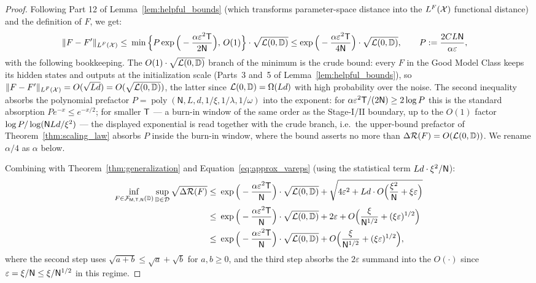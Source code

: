 \documentclass[11pt]{article}
\theoremstyle{plain}
\DeclareMathOperator{\poly}{poly}
\begin{document}
\begin{proof}
    Following Part 12 of Lemma~\ref{lem:helpful_bounds} (which transforms parameter-space distance into the $L^F({\cal X})$ functional distance) and the definition of $F$, we get:
    \begin{align*}
        \| F - F'\|_{L^F({\cal X})} \leq & ~ \min\Big\{ P\exp\Big(-\frac{\alpha \varepsilon^2 \mathsf{T}}{2\mathsf{N}}\Big),\, O(1) \Big\} \cdot \sqrt{{\cal L}(0, \mathbb{D})} \leq \exp\Big(-\frac{\alpha \varepsilon^2 \mathsf{T}}{4\mathsf{N}}\Big) \cdot \sqrt{{\cal L}(0, \mathbb{D})}, \qquad P := \frac{2CL\mathsf{N}}{\alpha\varepsilon},
    \end{align*}
    with the following bookkeeping. The $O(1)\cdot\sqrt{{\cal L}(0,\mathbb{D})}$ branch of the minimum is the crude bound: every $F$ in the Good Model Class keeps its hidden states and outputs at the initialization scale (Parts~3 and~5 of Lemma~\ref{lem:helpful_bounds}), so $\|F-F'\|_{L^F({\cal X})} = O(\sqrt{Ld}) = O(\sqrt{{\cal L}(0,\mathbb{D})})$, the latter since ${\cal L}(0,\mathbb{D}) = \Omega(Ld)$ with high probability over the noise. The second inequality absorbs the polynomial prefactor $P = \poly(\mathsf{N}, L, d, 1/\xi, 1/\lambda, 1/\omega)$ into the exponent: for $\alpha\varepsilon^2{\sf T}/(2\mathsf{N}) \ge 2\log P$ this is the standard absorption $P e^{-x} \le e^{-x/2}$; for smaller $\sf T$ --- a burn-in window of the same order as the Stage-I/II boundary, up to the $O(1)$ factor $\log P/\log({\sf N}Ld/\xi^2)$ --- the displayed exponential is read together with the crude branch, i.e.\ the upper-bound prefactor of Theorem~\ref{thm:scaling_law} absorbs $P$ inside the burn-in window, where the bound asserts no more than $\Delta{\cal R}(F) = O({\cal L}(0,\mathbb{D}))$. We rename $\alpha/4$ as $\alpha$ below.

    Combining with Theorem~\ref{thm:generalization} and Equation~\eqref{eq:approx_vareps} (using the statistical term $Ld\cdot\xi^2/{\sf N}$):
    \begin{align*}
        \inf_{F \in {\cal F}_{\sf M, T, N}(\mathbb{D})} \sup_{\mathbb{D} \in {\cal D}}  \sqrt{\Delta{\cal R}(F)} \leq & ~  \exp\Big(-\frac{\alpha \varepsilon^2 \mathsf{T}}{\mathsf{N}}\Big) \cdot \sqrt{{\cal L}(0, \mathbb{D})} + \sqrt{4\varepsilon^2 + Ld \cdot O\Big(\frac{\xi^2}{\sf N} + \xi\varepsilon\Big)} \\
        \leq & ~ \exp\Big(-\frac{\alpha \varepsilon^2 \mathsf{T}}{\mathsf{N}}\Big) \cdot \sqrt{{\cal L}(0, \mathbb{D})} + 2\varepsilon + O\Big(\frac{\xi}{{\sf N}^{1/2}} + (\xi\varepsilon)^{1/2}\Big) \\
        \leq & ~ \exp\Big(-\frac{\alpha \varepsilon^2 \mathsf{T}}{\mathsf{N}}\Big) \cdot \sqrt{{\cal L}(0, \mathbb{D})} + O\Big(\frac{\xi}{{\sf N}^{1/2}} + (\xi\varepsilon)^{1/2}\Big),
    \end{align*}
    where the second step uses $\sqrt{a+b} \leq \sqrt{a}+\sqrt{b}$ for $a,b\geq 0$, and the third step absorbs the $2\varepsilon$ summand into the $O(\cdot)$ since $\varepsilon = \xi/{\sf N} \leq \xi/{\sf N}^{1/2}$ in this regime.


\end{proof}
\end{document}

